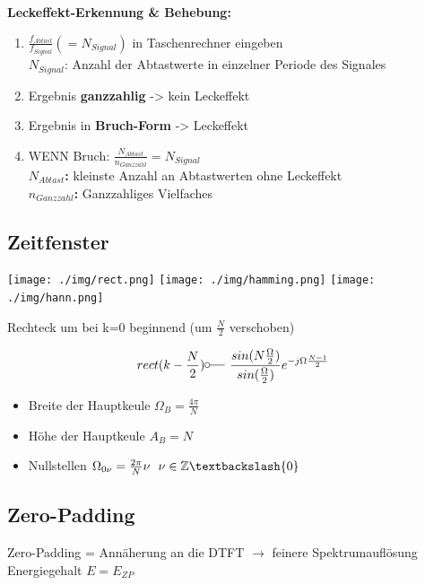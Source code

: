 \documentclass[10pt,a4paper]{article}
\begin{document}
\textbf{Leckeffekt-Erkennung \& Behebung:}
  \begin{enumerate}
  \item $\frac{f_{Abtast}}{f_{Signal}}(=N_{Signal})$ in Taschenrechner eingeben\\
  $N_{Signal}$: Anzahl der Abtastwerte in einzelner Periode des Signales
  \item Ergebnis \textbf{ganzzahlig} -> kein Leckeffekt
  \item Ergebnis in \textbf{Bruch-Form} -> Leckeffekt
  \item WENN Bruch: $\frac{N_{Abtast}}{n_{Ganzzahl}}=N_{Signal}$\\
  \textbf{$N_{Abtast}$: } kleinste Anzahl an Abtastwerten ohne Leckeffekt\\
  \textbf{$n_{Ganzzahl}$: } Ganzzahliges Vielfaches
   \end{enumerate}	 	 
\subsection{Zeitfenster}
  \begin{center}
      \texttt{[image: ./img/rect.png]}
      \texttt{[image: ./img/hamming.png]}
      \texttt{[image: ./img/hann.png]}
  \end{center}
  Rechteck um bei k=0 beginnend (um $\frac{N}{2}$ verschoben)
  \begin{mdframed}[style=exercise]
    \begin{align}
        rect(k-\frac{N}{2}) \fourier \frac{sin(N\frac{\Omega}{2})}{sin(\frac{\Omega}{2})} e^{-j\Omega\frac{N-1}{2}}
    \end{align}
  \end{mdframed}
  \begin{itemize}
    \item Breite der Hauptkeule $\Omega_B = \frac{4\pi}{N}$
    \item Höhe der Hauptkeule $A_B = N$
    \item Nullstellen $\Omega_{0\nu} = \frac{2\pi}{N}\nu \ \ \nu \in\mathbb{Z} \textbackslash\{0\}$
  \end{itemize}
\subsection{Zero-Padding}
Zero-Padding = Annäherung an die DTFT $\rightarrow$ feinere Spektrumauflösung Energiegehalt $E = E_{ZP}$ \\
\end{document}
